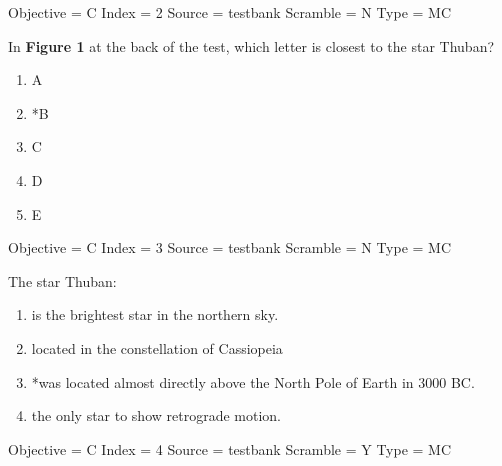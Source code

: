 \documentclass[11pt]{article}
\begin{document}
\begin{enumerate}
\begin{minipage}{\textwidth}
\begin{minipage}{\textwidth}
Objective = C
Index = 2
Source = testbank
Scramble = N
Type = MC
\end{minipage}
\end{minipage}
\vskip 0.20in

\begin{minipage}{\textwidth}
\begin{minipage}{\textwidth}
\item In {\bf Figure 1} at the back of the test, which letter is closest to the star Thuban?
\begin{multicols}{3}
\begin{enumerate} 
\setlength{\itemsep}{1pt} 
\setlength{\parskip}{0pt} 
\setlength{\parsep}{0pt}
\setlength{\multicolsep}{1pt} 
\item A
\item *B
\item C
\item D
\item E
\end{enumerate} 
\vfill 
\end{multicols}

Objective = C
Index = 3
Source = testbank
Scramble = N
Type = MC
\end{minipage}
\end{minipage}
\vskip 0.20in

\begin{minipage}{\textwidth}
\begin{minipage}{\textwidth}
\item The star Thuban:
\begin{enumerate} 
\setlength{\itemsep}{1pt} 
\setlength{\parskip}{0pt} 
\setlength{\parsep}{0pt}
\setlength{\multicolsep}{1pt} 
\item is the brightest star in the northern sky.
\item located in the constellation of Cassiopeia
\item *was located almost directly above the North Pole of Earth in 3000 BC.
\item the only star to show retrograde motion.
\end{enumerate} 
Objective = C
Index = 4
Source = testbank
Scramble = Y
Type = MC
\end{minipage}
\end{minipage}
\vskip 0.20in


\end{enumerate}
\end{document}
